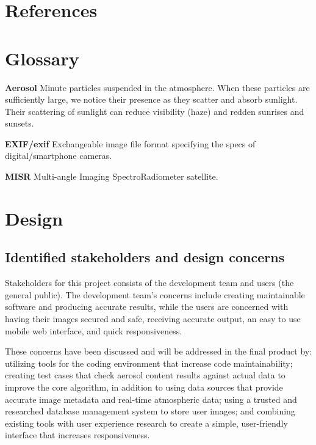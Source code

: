 \documentclass[onecolumn, draftclsnofoot,10pt, compsoc]{IEEEtran}
\begin{document}
\begin{flushleft}
\clearpage

\section{References}



\section{Glossary}
\textbf{Aerosol} Minute particles suspended in the atmosphere. When these particles are sufficiently large, we notice their presence as they scatter and absorb sunlight. Their scattering of sunlight can reduce visibility (haze) and redden sunrises and sunsets. \cite{1}

\medskip

\textbf{EXIF/exif} Exchangeable image file format specifying the specs of digital/smartphone cameras.

\medskip

\textbf{MISR} Multi-angle Imaging SpectroRadiometer satellite. \cite{2}

\clearpage

\section{Design}

\subsection{Identified stakeholders and design concerns}
Stakeholders for this project consists of the development team and users (the general public). The development team's concerns include creating maintainable software and producing accurate results, while the users are concerned with having their images secured and safe, receiving accurate output, an easy to use mobile web interface, and quick responsiveness. 

\medskip

These concerns have been discussed and will be addressed in the final product by: utilizing tools for the coding environment that increase code maintainability; creating test cases that check aerosol content results against actual data to improve the core algorithm, in addition to using data sources that provide accurate image metadata and real-time atmospheric data; using a trusted and researched database management system to store user images; and combining existing tools with user experience research to create a simple, user-friendly interface that increases responsiveness.


\end{flushleft}
\end{document}
